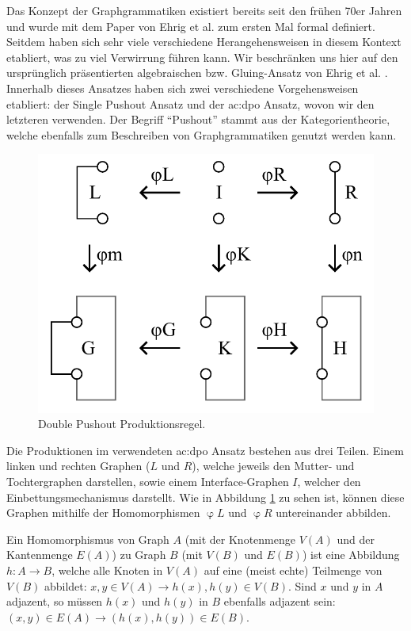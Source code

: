 Das Konzept der Graphgrammatiken existiert bereits seit den frühen 70er Jahren und wurde mit dem Paper von Ehrig et al. \cite{7_ehrig_et_al}
zum ersten Mal formal definiert. Seitdem haben sich sehr viele verschiedene Herangehensweisen in diesem Kontext etabliert, was zu viel Verwirrung
führen kann. \cite{30_könig_et_al} Wir beschränken uns hier auf den ursprünglich präsentierten algebraischen bzw. Gluing-Ansatz von Ehrig 
et al. \cite{7_ehrig_et_al}. Innerhalb dieses Ansatzes haben sich zwei verschiedene Vorgehensweisen etabliert: der Single Pushout Ansatz und der
\gls{ac:dpo} Ansatz, wovon wir den letzteren verwenden. Der Begriff ``Pushout'' stammt aus der Kategorientheorie, welche ebenfalls zum Beschreiben
von Graphgrammatiken genutzt werden kann. \cite{1_merrell}

\begin{figure}[t]
    \centering
    \includegraphics[width=\imgWidth/2]{images/dpo_rule.pdf}
    \caption{Double Pushout Produktionsregel.}
    \label{fig:dpo_rule}
\end{figure}

Die Produktionen im verwendeten \gls{ac:dpo} Ansatz bestehen aus drei Teilen. Einem linken und rechten Graphen (\(L\) und \(R\)), welche jeweils
den Mutter- und Tochtergraphen darstellen, sowie einem Interface-Graphen \(I\), welcher den Einbettungsmechanismus darstellt. Wie in Abbildung
\ref{fig:dpo_rule} zu sehen ist, können diese Graphen mithilfe der Homomorphismen \(\upvarphi L\) und \(\upvarphi R\) untereinander abbilden.

Ein Homomorphismus von Graph \(A\) (mit der Knotenmenge \(V(A)\) und der Kantenmenge \(E(A)\)) zu Graph \(B\) (mit \(V(B)\) und \(E(B)\)) ist eine
Abbildung \(h: A \rightarrow B\), welche alle Knoten in \(V(A)\) auf eine (meist echte) Teilmenge von \(V(B)\) abbildet: \(x, y \in V(A)
\rightarrow h(x), h(y) \in V(B)\). Sind \(x\) und \(y\) in \(A\) adjazent, so müssen \(h(x)\) und \(h(y)\) in \(B\) ebenfalls adjazent sein:
\((x, y) \in E(A) \rightarrow (h(x), h(y)) \in E(B)\). \cite{35_sabidussi}


